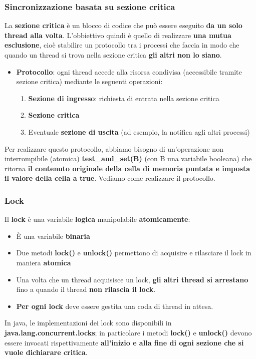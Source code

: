 \documentclass[12pt]{article}
\begin{document}
\subsubsection{Sincronizzazione basata su sezione critica}
La \textbf{sezione critica} è un blocco di codice che può essere eseguito \textbf{da un solo thread alla volta}. L'obbiettivo quindi è quello di realizzare \textbf{una mutua esclusione}, cioè stabilire un protocollo tra i processi che faccia in modo che quando un thread si trova nella sezione critica \textbf{gli altri non lo siano}.
\begin{itemize}
    \item \textbf{Protocollo}: ogni thread accede alla risorsa condivisa (accessibile tramite sezione critica) mediante le seguenti operazioni:
          \begin{enumerate}
              \item \textbf{Sezione di ingresso}: richiesta di entrata nella sezione critica
              \item \textbf{Sezione critica}
              \item Eventuale \textbf{sezione di uscita} (ad esempio, la notifica agli altri processi)
          \end{enumerate}
\end{itemize}
Per realizzare questo protocollo, abbiamo bisogno di un'operazione non interrompibile (atomica) \textbf{test\_and\_set(B)} (con B una variabile booleana) che ritorna \textbf{il contenuto originale della cella di memoria puntata e imposta il valore della cella a true}. Vediamo come realizzare il protocollo.
\subsubsection{Lock}
Il \textbf{lock} è una variabile \textbf{logica} manipolabile \textbf{atomicamente}:
\begin{itemize}
    \item È una variabile \textbf{binaria}
    \item Due metodi \textbf{lock()} e \textbf{unlock()} permettono di acquisire e rilasciare il lock in maniera \textbf{atomica}
    \item Una volta che un thread acquisisce un lock, \textbf{gli altri thread si arrestano} fino a quando il thread \textbf{non rilascia il lock}.
    \item \textbf{Per ogni lock} deve essere gestita una coda di thread in attesa.
\end{itemize}
In java, le implementazioni dei lock sono disponibili in \textbf{java.lang.concurrent.locks}; in particolare i metodi \textbf{lock()} e \textbf{unlock()} devono essere invocati rispettivamente \textbf{all'inizio e alla fine di ogni sezione che si vuole dichiarare critica}.
\end{document}
